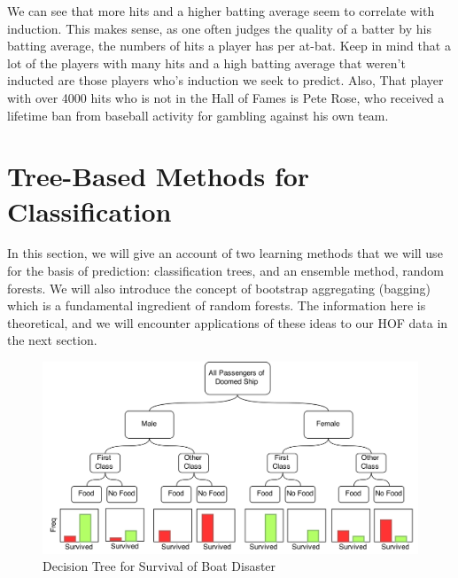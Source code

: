 \documentclass[preprint,12pt]{elsarticle}
\begin{document}
We can see that more hits and a higher batting average seem to correlate with induction. This makes sense, as one often judges the quality of a batter by his batting average, the numbers of hits a player has per at-bat. Keep in mind that a lot of the players with many hits and a high batting average that weren't inducted are those players who's induction we seek to predict. Also, That player with over 4000 hits who is not in the Hall of Fames is Pete Rose, who received a lifetime ban from baseball activity for gambling against his own team.







\section{Tree-Based Methods for Classification}
\label{method}

In this section, we will give an account of two learning methods that we will use for the basis of prediction: classification trees, and an ensemble method, random forests. We will also introduce the concept of bootstrap aggregating (bagging) which is a fundamental ingredient of random forests. The information here is theoretical, and we will encounter applications of these ideas to our HOF data in the next section.
\begin{figure}[h]
	\centering
	\includegraphics[width=1\textwidth]{TreeExample}
	\caption{Decision Tree for Survival of Boat Disaster}
	\label{fig:SampleTree}
\end{figure}
\end{document}
